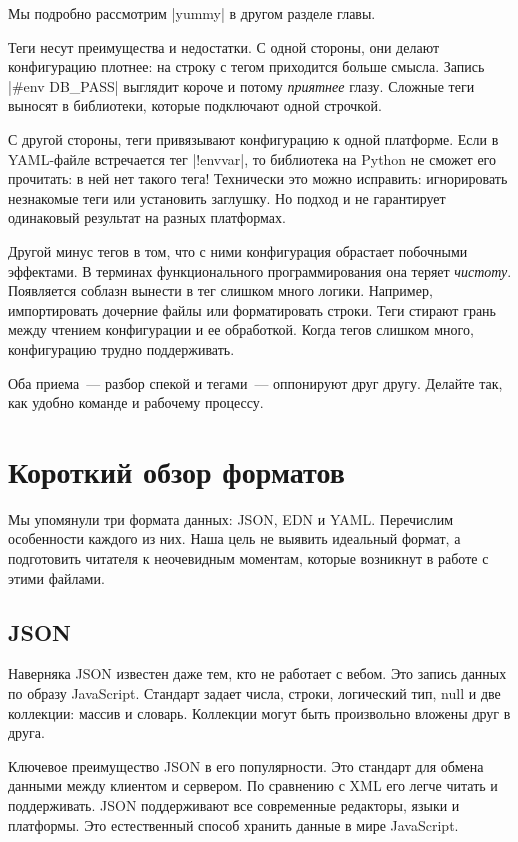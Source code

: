 Мы подробно рассмотрим \spverb|yummy| в другом разделе главы.

Теги несут преимущества и недостатки. С одной стороны, они делают конфигурацию
плотнее: на строку с тегом приходится больше смысла. Запись \spverb|#env DB_PASS|
выглядит короче и потому \emph{приятнее} глазу. Сложные теги выносят в библиотеки,
которые подключают одной строчкой.

С другой стороны, теги привязывают конфигурацию к одной платформе. Если в
YAML-файле встречается тег \spverb|!envvar|, то библиотека на Python не сможет
его прочитать: в ней нет такого тега! Технически это можно исправить:
игнорировать незнакомые теги или установить заглушку. Но подход и не гарантирует
одинаковый результат на разных платформах.

Другой минус тегов в том, что с ними конфигурация обрастает побочными
эффектами. В терминах функционального программирования она теряет
\emph{чистоту}. Появляется соблазн вынести в тег слишком много логики. Например,
импортировать дочерние файлы или форматировать строки. Теги стирают грань между
чтением конфигурации и ее обработкой. Когда тегов слишком много, конфигурацию
трудно поддерживать.

Оба приема~--- разбор спекой и тегами~--- оппонируют друг другу. Делайте так,
как удобно команде и рабочему процессу.

\section{Короткий обзор форматов}

Мы упомянули три формата данных: JSON, EDN и YAML. Перечислим особенности
каждого из них. Наша цель не выявить идеальный формат, а подготовить читателя к
неочевидным моментам, которые возникнут в работе с этими файлами.

\subsection{JSON}

Наверняка JSON известен даже тем, кто не работает с вебом. Это запись данных по
образу JavaScript. Стандарт задает числа, строки, логический тип, null и две
коллекции: массив и словарь. Коллекции могут быть произвольно вложены друг в
друга.

Ключевое преимущество JSON в его популярности. Это стандарт для обмена данными
между клиентом и сервером. По сравнению с XML его легче читать и
поддерживать. JSON поддерживают все современные редакторы, языки и
платформы. Это естественный способ хранить данные в мире JavaScript.

